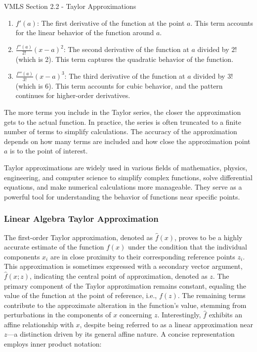 \begin{notes}{VMLS Section 2.2 - Taylor Approximations}
\begin{enumerate}
        \item \(f'(a)\): The first derivative of the function at the point \(a\). This term accounts for the linear behavior of the function around \(a\).
        
        \item \(\frac{f''(a)}{2!}(x-a)^2\): The second derivative of the function at \(a\) divided by \(2!\) (which is 2). This term captures the quadratic behavior of the function.
        
        \item \(\frac{f'''(a)}{3!}(x-a)^3\): The third derivative of the function at \(a\) divided by \(3!\) (which is 6). This term accounts for cubic behavior, and the pattern continues for higher-order derivatives.
    \end{enumerate}
    
    The more terms you include in the Taylor series, the closer the approximation gets to the actual function. In practice, the series is often truncated to a finite number of terms to simplify calculations. The accuracy of the 
    approximation depends on how many terms are included and how close the approximation point \(a\) is to the point of interest.
    
    Taylor approximations are widely used in various fields of mathematics, physics, engineering, and computer science to simplify complex functions, solve differential equations, and make numerical calculations more manageable. They 
    serve as a powerful tool for understanding the behavior of functions near specific points.

    \subsubsection*{Linear Algebra Taylor Approximation}

    The first-order Taylor approximation, denoted as $\hat{f}(x)$, proves to be a highly accurate estimate of the function $f(x)$ under the condition that the individual components $x_i$ are in close proximity to their corresponding reference 
    points $z_i$. This approximation is sometimes expressed with a secondary vector argument, $\hat{f}(x; z)$, indicating the central point of approximation, denoted as $z$. The primary component of the Taylor approximation remains constant, 
    equaling the value of the function at the point of reference, i.e., $f(z)$. The remaining terms contribute to the approximate alteration in the function's value, stemming from perturbations in the components of $x$ concerning $z$. Interestingly, 
    $\hat{f}$ exhibits an affine relationship with $x$, despite being referred to as a linear approximation near $z$—a distinction driven by its general affine nature. A concise representation employs inner product notation:


\end{notes}
